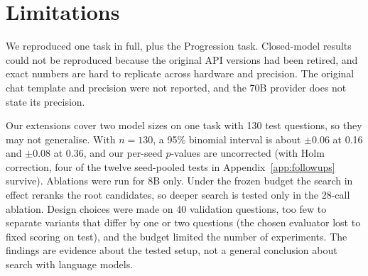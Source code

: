 \section{Limitations}
\label{sec:limitations}

We reproduced one task in full, plus the Progression task. Closed-model results could not be reproduced because the original API versions had been retired, and exact numbers are hard to replicate across hardware and precision. The original chat template and precision were not reported, and the 70B provider does not state its precision.

Our extensions cover two model sizes on one task with 130 test questions, so they may not generalise. With $n=130$, a 95\% binomial interval is about $\pm0.06$ at 0.16 and $\pm0.08$ at 0.36, and our per-seed $p$-values are uncorrected (with Holm correction, four of the twelve seed-pooled tests in Appendix~\ref{app:followups} survive). Ablations were run for 8B only. Under the frozen budget the search in effect reranks the root candidates, so deeper search is tested only in the 28-call ablation.  Design choices were made on 40 validation questions, too few to separate variants that differ by one or two questions (the chosen evaluator lost to fixed scoring on test), and the budget limited the number of experiments. The findings are evidence about the tested setup, not a general conclusion about search with language models.